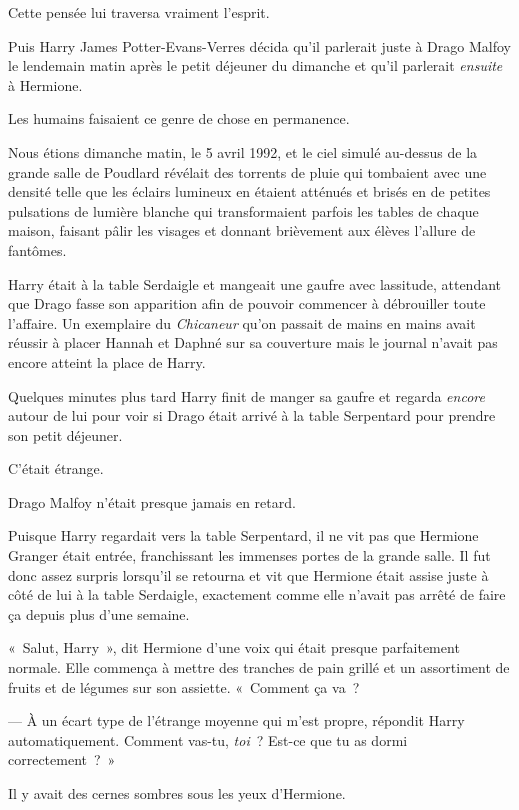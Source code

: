 Cette pensée lui traversa vraiment l'esprit.

Puis Harry James Potter-Evans-Verres décida qu'il parlerait juste à Drago Malfoy le lendemain matin après le petit déjeuner du dimanche et qu'il parlerait \emph{ensuite} à Hermione.

Les humains faisaient ce genre de chose en permanence.

\later

Nous étions dimanche matin, le 5 avril 1992, et le ciel simulé au-dessus de la grande salle de Poudlard révélait des torrents de pluie qui tombaient avec une densité telle que les éclairs lumineux en étaient atténués et brisés en de petites pulsations de lumière blanche qui transformaient parfois les tables de chaque maison, faisant pâlir les visages et donnant brièvement aux élèves l'allure de fantômes.

Harry était à la table Serdaigle et mangeait une gaufre avec lassitude, attendant que Drago fasse son apparition afin de pouvoir commencer à débrouiller toute l'affaire. Un exemplaire du \emph{Chicaneur} qu'on passait de mains en mains avait réussir à placer Hannah et Daphné sur sa couverture mais le journal n'avait pas encore atteint la place de Harry.

Quelques minutes plus tard Harry finit de manger sa gaufre et regarda \emph{encore} autour de lui pour voir si Drago était arrivé à la table Serpentard pour prendre son petit déjeuner.

C'était étrange.

Drago Malfoy n'était presque jamais en retard.

Puisque Harry regardait vers la table Serpentard, il ne vit pas que Hermione Granger était entrée, franchissant les immenses portes de la grande salle. Il fut donc assez surpris lorsqu'il se retourna et vit que Hermione était assise juste à côté de lui à la table Serdaigle, exactement comme elle n'avait pas arrêté de faire ça depuis plus d'une semaine.

«~Salut, Harry~», dit Hermione d'une voix qui était presque parfaitement normale. Elle commença à mettre des tranches de pain grillé et un assortiment de fruits et de légumes sur son assiette. «~Comment ça va~?

--- À un écart type de l'étrange moyenne qui m'est propre, répondit Harry automatiquement. Comment vas-tu, \emph{toi}~? Est-ce que tu as dormi correctement~?~»

Il y avait des cernes sombres sous les yeux d'Hermione.

